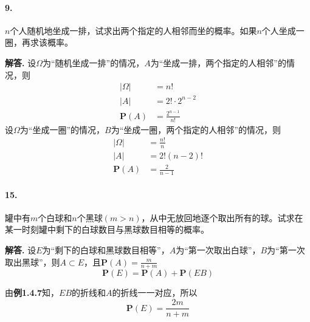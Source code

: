 \documentclass[12pt, a4paper, oneside]{ctexart}
\newenvironment{solution}{\par\noindent\textbf{解答. }}{\bigskip\par}
\begin{document}
\paragraph{9.}$n$个人随机地坐成一排，试求出两个指定的人相邻而坐的概率。如果$n$个人坐成一圈，再求该概率。
\begin{solution}
    设$\Omega$为“随机坐成一排”的情况，$A$为“坐成一排，两个指定的人相邻”的情况，则
    \begin{equation*}
        \begin{aligned}
            |\Omega| &= n!\\
            |A| &= 2!\cdot 2^{n-2}\\
            \textbf{P}(A) &= \frac{2^{n-1}}{n!}
        \end{aligned}
    \end{equation*}
    设$\Omega$为“坐成一圈”的情况，$B$为“坐成一圈，两个指定的人相邻”的情况，则
    \begin{equation*}
        \begin{aligned}
            |\Omega| &= \frac{n!}{n}\\
            |A| &= 2!(n-2)!\\
            \textbf{P}(A) &= \frac{2}{n-1}
        \end{aligned}
    \end{equation*}
\end{solution}
\paragraph{15.}罐中有$m$个白球和$n$个黑球$(m>n)$，从中无放回地逐个取出所有的球。试求在某一时刻罐中剩下的白球数目与黑球数目相等的概率。
\begin{solution}
    设$E$为“剩下的白球和黑球数目相等”，$A$为“第一次取出白球”，$B$为“第一次取出黑球”，则$A\subset E$，且$\textbf{P}(A) = \frac{m}{n+m}$
    \begin{equation*}
        \textbf{P}(E) = \textbf{P}(A)+\textbf{P}(EB)
    \end{equation*}
    
    由\textbf{例1.4.7}知，$EB$的折线和$A$的折线一一对应，所以
    \begin{equation*}
        \textbf{P}(E) = \frac{2m}{n+m}
    \end{equation*}
\end{solution}
\end{document}
